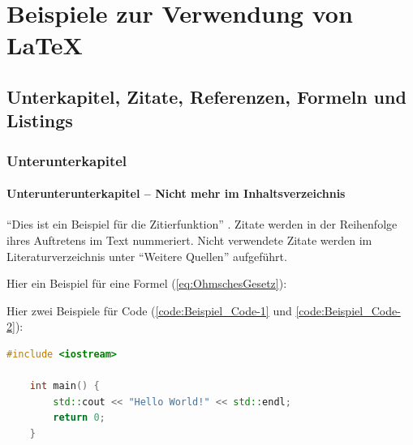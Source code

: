 



\chapter{Beispiele zur Verwendung von LaTeX}
   
\section{Unterkapitel, Zitate, Referenzen, Formeln und Listings}\label{sec:Unterkapitel}

\subsection{Unterunterkapitel}
\subsubsection{Unterunterunterkapitel -- Nicht mehr im Inhaltsverzeichnis}

\enquote{Dies ist ein Beispiel für die Zitierfunktion} \cite[Vgl.][S. 1 ff.]{2024}. Zitate werden in der Reihenfolge ihres Auftretens im Text nummeriert. Nicht verwendete Zitate werden im Literaturverzeichnis unter \enquote{Weitere Quellen} aufgeführt.


Hier ein Beispiel für eine Formel (\autoref{eq:OhmschesGesetz}):

Hier zwei Beispiele für Code (\autoref{code:Beispiel_Code-1} und \autoref{code:Beispiel_Code-2}):

\begin{lstlisting}[language=C++, caption={Beispiel: direktes einfügen von Code}, label={code:Beispiel_Code-1}]
    #include <iostream>

    int main() {
        std::cout << "Hello World!" << std::endl;
        return 0;
    }
\end{lstlisting}


